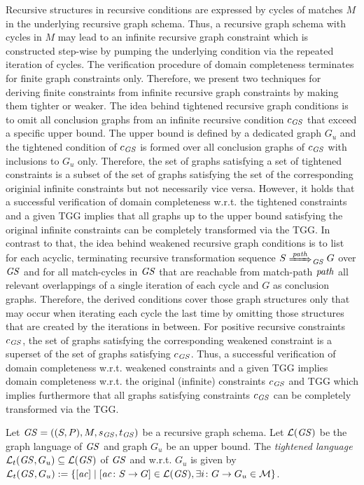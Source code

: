 Recursive structures in recursive conditions are expressed by cycles of matches $M$ in the underlying recursive graph schema.
Thus, a recursive graph schema with cycles in $M$ may lead to an infinite recursive graph constraint which is constructed step-wise by pumping the underlying condition via the repeated iteration of cycles.
The verification procedure of domain completeness terminates for finite graph constraints only.
Therefore, we present two techniques for deriving finite constraints from infinite recursive graph constraints by making them tighter or weaker.
The idea behind tightened recursive graph conditions is to omit all conclusion graphs from an infinite recursive condition $c_\mathit{GS}$ that exceed a specific upper bound.
The upper bound is defined by a dedicated graph $G_u$ and the tightened condition of $c_\mathit{GS}$ is formed over all conclusion graphs of $c_\mathit{GS}$ with inclusions to $G_u$ only.
Therefore, the set of graphs satisfying a set of tightened constraints is a subset of the set of graphs satisfying the set of the corresponding originial infinite constraints but not necessarily vice versa.
However, it holds that a successful verification of domain completeness w.r.t. the tightened constraints and a given TGG implies that all graphs up to the upper bound satisfying the original infinite constraints can be completely transformed via the TGG.
In contrast to that, the idea behind weakened recursive graph conditions is to list for each acyclic, terminating recursive transformation sequence $S \Trans{\paths}_\GS G$ over $\mathit{GS}$ and for all match-cycles in $\mathit{GS}$ that are reachable from match-path $\mathit{path}$ all relevant overlappings of a single iteration of each cycle and $G$ as conclusion graphs.
Therefore, the derived conditions cover those graph structures only that may occur when iterating each cycle the last time by omitting those structures that are created by the iterations in between.
For positive recursive constraints $c_\mathit{GS}$, the set of graphs satisfying the corresponding weakened constraint is a superset of the set of graphs satisfying $c_\mathit{GS}$.
Thus, a successful verification of domain completeness w.r.t. weakened constraints and a given TGG implies domain completeness w.r.t. the original (infinite) constraints $c_\mathit{GS}$ and TGG which implies furthermore that all graphs satisfying constraints $c_\mathit{GS}$ can be completely transformed via the TGG.

\begin{definition}
\label{def:sec-dc-general-rec:t_g_lang}
Let $\mathit{GS}=((S,P),M,s_\mathit{GS},t_\mathit{GS})$ be a recursive graph schema.
Let $\mathcal{L}(\mathit{GS})$ be the graph language of $\mathit{GS}$ and graph $G_u$ be an upper bound.
The \emph{tightened language $\mathcal{L}_t(\mathit{GS},G_u) \subseteq \mathcal{L}(\mathit{GS})$} of $\mathit{GS}$ and w.r.t. $G_u$ is given by $\mathcal{L}_t(\mathit{GS},G_u):=\{[\mathit{ac}] \mid [\mathit{ac}\colon S \to G] \in \mathcal{L}(\mathit{GS}),\exists i\colon G \to G_u \in {\cal M}\}$.
\envEndMarker
\end{definition}

